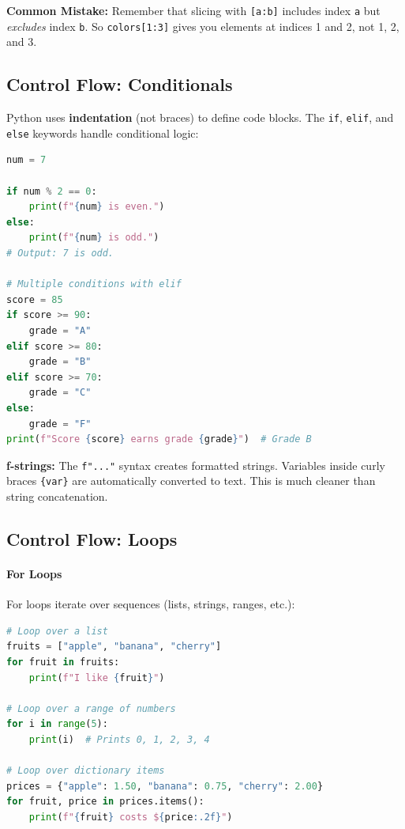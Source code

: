\begin{warn}
\textbf{Common Mistake:} Remember that slicing with \texttt{[a:b]} includes index \texttt{a} but \emph{excludes} index \texttt{b}. So \texttt{colors[1:3]} gives you elements at indices 1 and 2, not 1, 2, and 3.
\end{warn}

\subsection{Control Flow: Conditionals}

Python uses \textbf{indentation} (not braces) to define code blocks. The \texttt{if}, \texttt{elif}, and \texttt{else} keywords handle conditional logic:

\begin{lstlisting}[language=Python]
num = 7

if num % 2 == 0:
    print(f"{num} is even.")
else:
    print(f"{num} is odd.")
# Output: 7 is odd.

# Multiple conditions with elif
score = 85
if score >= 90:
    grade = "A"
elif score >= 80:
    grade = "B"
elif score >= 70:
    grade = "C"
else:
    grade = "F"
print(f"Score {score} earns grade {grade}")  # Grade B
\end{lstlisting}

\begin{info}
\textbf{f-strings:} The \texttt{f"..."} syntax creates formatted strings. Variables inside curly braces \texttt{\{var\}} are automatically converted to text. This is much cleaner than string concatenation.
\end{info}

\subsection{Control Flow: Loops}

\paragraph{For Loops}

For loops iterate over sequences (lists, strings, ranges, etc.):

\begin{lstlisting}[language=Python]
# Loop over a list
fruits = ["apple", "banana", "cherry"]
for fruit in fruits:
    print(f"I like {fruit}")

# Loop over a range of numbers
for i in range(5):
    print(i)  # Prints 0, 1, 2, 3, 4

# Loop over dictionary items
prices = {"apple": 1.50, "banana": 0.75, "cherry": 2.00}
for fruit, price in prices.items():
    print(f"{fruit} costs ${price:.2f}")
\end{lstlisting}

